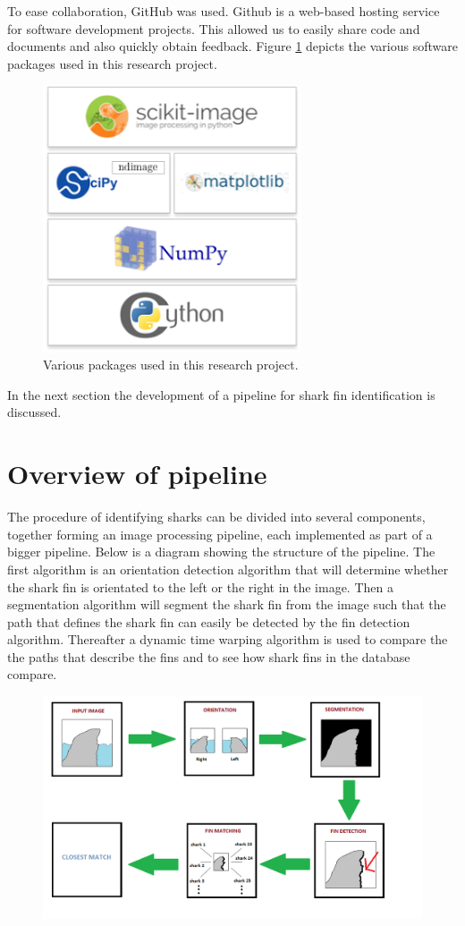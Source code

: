 \documentclass[a4paper,10pt]{article}
\begin{document}
To ease collaboration, GitHub was used.  Github is a web-based hosting service
for software development projects.  This allowed us to easily
share code and documents and also quickly obtain feedback.
Figure \ref{packages} depicts the various software packages used in this research project.

\begin{figure}[H]
 \centering
 \includegraphics[width=3in]{logos.jpg}
 \caption{Various packages used in this research project.}
 \label{packages}
\end{figure}

In the next section the development of a pipeline for shark fin identification is discussed.

\newpage
\section{Overview of pipeline}
The procedure of identifying sharks can be
  divided into several components, together forming an image processing pipeline, each implemented as part of
  a bigger pipeline.  Below is a diagram showing the structure of the pipeline.  The first algorithm is an orientation detection
algorithm that will determine whether the shark fin is orientated to the left or the right in the image.
Then a segmentation algorithm will segment the shark fin from the image such that the path that defines the shark fin 
can easily be detected by the fin detection algorithm.  Thereafter a dynamic time warping algorithm is used
to compare the the paths that describe the fins and to see how shark fins in the database compare.

\begin{figure}[H]
 \centering
 \includegraphics[width=5in]{pipeline.png}
\end{figure}
\end{document}
